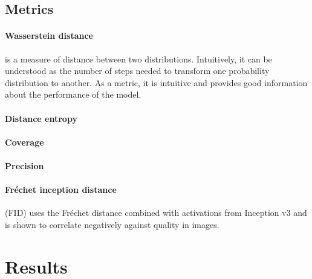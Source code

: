 \documentclass{article}
\begin{document}
\subsection{Metrics}

\paragraph{Wasserstein distance} is a measure of distance between two distributions. Intuitively, it can be understood as the number of steps needed to transform one probability distribution to another. \cite{lil} As a metric, it is intuitive and provides good information about the performance of the model.

\paragraph{Distance entropy}

\paragraph{Coverage}

\paragraph{Precision}

\paragraph{Fréchet inception distance} (FID) uses the Fréchet distance combined with activations from Inception v3 and is shown to correlate negatively against quality in images.\cite{yu2021frechet} 

\section{Results}
\end{document}
